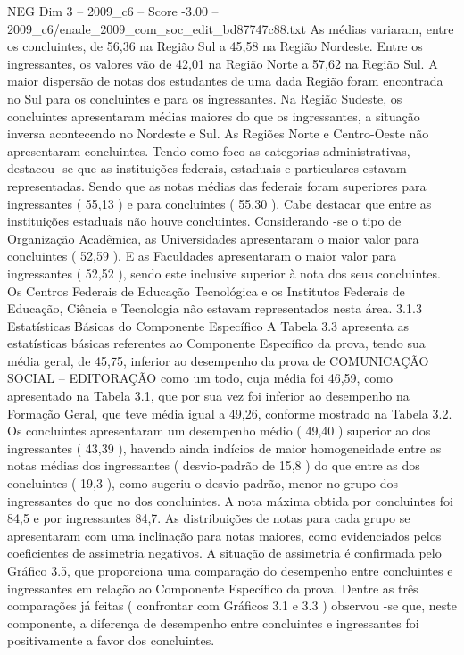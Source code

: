\begin{textsample}{NEG Dim 3 – 2009\_c6 – Score -3.00 – 2009\_c6/enade\_2009\_com\_soc\_edit\_bd87747c88.txt}
As médias variaram, entre os concluintes, de 56,36 na Região Sul a 45,58 na Região Nordeste.
Entre os ingressantes, os valores vão de 42,01 na Região Norte a 57,62 na Região Sul.
A maior dispersão de notas dos estudantes de uma dada Região foram encontrada no Sul para os concluintes e para os ingressantes.
Na Região Sudeste, os concluintes apresentaram médias maiores do que os ingressantes, a situação inversa acontecendo no Nordeste e Sul.
As Regiões Norte e Centro-Oeste não apresentaram concluintes.
Tendo como foco as categorias administrativas, destacou -se que as instituições federais, estaduais e particulares estavam representadas.
Sendo que as notas médias das federais foram superiores para ingressantes ( 55,13 ) e para concluintes ( 55,30 ).
Cabe destacar que entre as instituições estaduais não houve concluintes.
Considerando -se o tipo de Organização Acadêmica, as Universidades apresentaram o maior valor para concluintes ( 52,59 ).
E as Faculdades apresentaram o maior valor para ingressantes ( 52,52 ), sendo este inclusive superior à nota dos seus concluintes.
Os Centros Federais de Educação Tecnológica e os Institutos Federais de Educação, Ciência e Tecnologia não estavam representados nesta área. 3.1.3 Estatísticas Básicas do Componente Específico A Tabela 3.3 apresenta as estatísticas básicas referentes ao Componente Específico da prova, tendo sua média geral, de 45,75, inferior ao desempenho da prova de COMUNICAÇÃO SOCIAL – EDITORAÇÃO como um todo, cuja média foi 46,59, como apresentado na Tabela 3.1, que por sua vez foi inferior ao desempenho na Formação Geral, que teve média igual a 49,26, conforme mostrado na Tabela 3.2.
Os concluintes apresentaram um desempenho médio ( 49,40 ) superior ao dos ingressantes ( 43,39 ), havendo ainda indícios de maior homogeneidade entre as notas médias dos ingressantes ( desvio-padrão de 15,8 ) do que entre as dos concluintes ( 19,3 ), como sugeriu o desvio padrão, menor no grupo dos ingressantes do que no dos concluintes.
A nota máxima obtida por concluintes foi 84,5 e por ingressantes 84,7.
As distribuições de notas para cada grupo se apresentaram com uma inclinação para notas maiores, como evidenciados pelos coeficientes de assimetria negativos.
A situação de assimetria é confirmada pelo Gráfico 3.5, que proporciona uma comparação do desempenho entre concluintes e ingressantes em relação ao Componente Específico da prova.
Dentre as três comparações já feitas ( confrontar com Gráficos 3.1 e 3.3 ) observou -se que, neste componente, a diferença de desempenho entre concluintes e ingressantes foi positivamente a favor dos concluintes.

\end{textsample}
